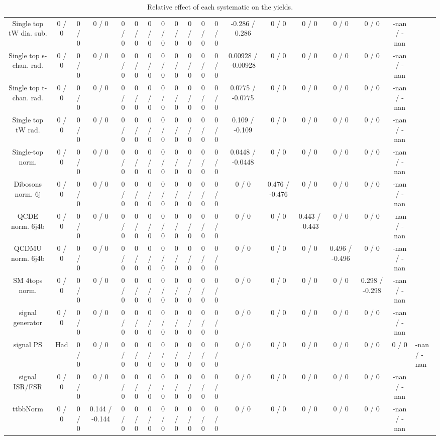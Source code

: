 \documentclass[10pt]{article}
\begin{document}
\begin{table}[htbp]
\begin{center}
\begin{tabular}{|c|c|c|c|c|c|c|c|c|c|c|c|c|c|c|c|c|c|}
  Single top tW dia. sub. & 0 / 0 & 0 / 0 & 0 / 0 & 0 / 0 & 0 / 0 & 0 / 0 & 0 / 0 & 0 / 0 & 0 / 0 & 0 / 0 & 0 / 0 & -0.286 / 0.286 & 0 / 0 & 0 / 0 & 0 / 0 & 0 / 0 & -nan / -nan \\ 
  Single top s-chan. rad. & 0 / 0 & 0 / 0 & 0 / 0 & 0 / 0 & 0 / 0 & 0 / 0 & 0 / 0 & 0 / 0 & 0 / 0 & 0 / 0 & 0 / 0 & 0.00928 / -0.00928 & 0 / 0 & 0 / 0 & 0 / 0 & 0 / 0 & -nan / -nan \\ 
  Single top t-chan. rad. & 0 / 0 & 0 / 0 & 0 / 0 & 0 / 0 & 0 / 0 & 0 / 0 & 0 / 0 & 0 / 0 & 0 / 0 & 0 / 0 & 0 / 0 & 0.0775 / -0.0775 & 0 / 0 & 0 / 0 & 0 / 0 & 0 / 0 & -nan / -nan \\ 
  Single top tW rad. & 0 / 0 & 0 / 0 & 0 / 0 & 0 / 0 & 0 / 0 & 0 / 0 & 0 / 0 & 0 / 0 & 0 / 0 & 0 / 0 & 0 / 0 & 0.109 / -0.109 & 0 / 0 & 0 / 0 & 0 / 0 & 0 / 0 & -nan / -nan \\ 
  Single-top norm. & 0 / 0 & 0 / 0 & 0 / 0 & 0 / 0 & 0 / 0 & 0 / 0 & 0 / 0 & 0 / 0 & 0 / 0 & 0 / 0 & 0 / 0 & 0.0448 / -0.0448 & 0 / 0 & 0 / 0 & 0 / 0 & 0 / 0 & -nan / -nan \\ 
  Dibosons norm. 6j & 0 / 0 & 0 / 0 & 0 / 0 & 0 / 0 & 0 / 0 & 0 / 0 & 0 / 0 & 0 / 0 & 0 / 0 & 0 / 0 & 0 / 0 & 0 / 0 & 0.476 / -0.476 & 0 / 0 & 0 / 0 & 0 / 0 & -nan / -nan \\ 
  QCDE norm. 6j4b & 0 / 0 & 0 / 0 & 0 / 0 & 0 / 0 & 0 / 0 & 0 / 0 & 0 / 0 & 0 / 0 & 0 / 0 & 0 / 0 & 0 / 0 & 0 / 0 & 0 / 0 & 0.443 / -0.443 & 0 / 0 & 0 / 0 & -nan / -nan \\ 
  QCDMU norm. 6j4b & 0 / 0 & 0 / 0 & 0 / 0 & 0 / 0 & 0 / 0 & 0 / 0 & 0 / 0 & 0 / 0 & 0 / 0 & 0 / 0 & 0 / 0 & 0 / 0 & 0 / 0 & 0 / 0 & 0.496 / -0.496 & 0 / 0 & -nan / -nan \\ 
  SM 4tops norm. & 0 / 0 & 0 / 0 & 0 / 0 & 0 / 0 & 0 / 0 & 0 / 0 & 0 / 0 & 0 / 0 & 0 / 0 & 0 / 0 & 0 / 0 & 0 / 0 & 0 / 0 & 0 / 0 & 0 / 0 & 0.298 / -0.298 & -nan / -nan \\ 
  signal generator & 0 / 0 & 0 / 0 & 0 / 0 & 0 / 0 & 0 / 0 & 0 / 0 & 0 / 0 & 0 / 0 & 0 / 0 & 0 / 0 & 0 / 0 & 0 / 0 & 0 / 0 & 0 / 0 & 0 / 0 & 0 / 0 & -nan / -nan \\ 
  signal PS & Had & 0 / 0 & 0 / 0 & 0 / 0 & 0 / 0 & 0 / 0 & 0 / 0 & 0 / 0 & 0 / 0 & 0 / 0 & 0 / 0 & 0 / 0 & 0 / 0 & 0 / 0 & 0 / 0 & 0 / 0 & 0 / 0 & -nan / -nan \\ 
  signal ISR/FSR & 0 / 0 & 0 / 0 & 0 / 0 & 0 / 0 & 0 / 0 & 0 / 0 & 0 / 0 & 0 / 0 & 0 / 0 & 0 / 0 & 0 / 0 & 0 / 0 & 0 / 0 & 0 / 0 & 0 / 0 & 0 / 0 & -nan / -nan \\ 
 ttbbNorm & 0 / 0 & 0 / 0 & 0.144 / -0.144 & 0 / 0 & 0 / 0 & 0 / 0 & 0 / 0 & 0 / 0 & 0 / 0 & 0 / 0 & 0 / 0 & 0 / 0 & 0 / 0 & 0 / 0 & 0 / 0 & 0 / 0 & -nan / -nan \\ 
\hline 
\end{tabular} 
\caption{Relative effect of each systematic on the yields.} 
\end{center} 
\end{table} 
\end{document}
